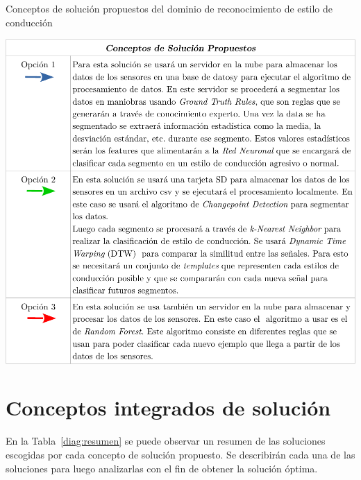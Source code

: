 \begin{table}[htbp!]
  \centering
  \caption{Conceptos de solución propuestos del dominio de reconocimiento de estilo de conducción}
  \label{diag:sol_clas}
  \includegraphics[width=\linewidth]{sol_clas.pdf}
\end{table}

\newpage

\section{Conceptos integrados de solución}
En la Tabla~\ref{diag:resumen} se puede observar un resumen de las soluciones escogidas por cada concepto de solución propuesto. Se describirán cada una de las soluciones para luego analizarlas con el fin de obtener la solución óptima.

